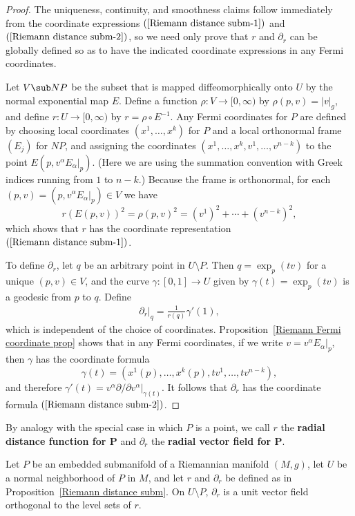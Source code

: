 \begin{proof}
The uniqueness, continuity, and smoothness claims follow immediately from the coordinate expressions $(\ref{Riemann distance subm-1})$ and $(\ref{Riemann distance subm-2})$, 
so we need only prove that $r$ and $\partial_r$ can be globally defined so as to have the indicated coordinate expressions in any Fermi coordinates.\par
Let $V\sub NP$ be the subset that is mapped diffeomorphically onto $U$ by the normal exponential map $E$. Define a function $\rho:V\to[0,\infty)$ by $\rho(p,v)=|v|_g$, 
and define $r:U\to[0,\infty)$ by $r=\rho\circ E^{-1}$. Any Fermi coordinates for $P$ are defined by choosing local coordinates $(x^1,\dots,x^k)$ for $P$ and a local 
orthonormal frame $(E_j)$ for $NP$, and assigning the coordinates $(x^1,\dots,x^k,v^1,\dots,v^{n-k})$ to the point $E(p,v^\alpha E_\alpha|_p)$. (Here we are using the 
summation convention with Greek indices running from $1$ to $n-k$.) Because the frame is orthonormal, for each $(p,v)=(p,v^\alpha E_\alpha|_p)\in V$ we have 
\[r(E(p,v))^2=\rho(p,v)^2=(v^1)^2+\cdots+(v^{n-k})^2,\]
which shows that $r$ has the coordinate representation $(\ref{Riemann distance subm-1})$.\par
To define $\partial_r$, let $q$ be an arbitrary point in $U\setminus P$. Then $q=\exp_p(tv)$ for a unique $(p,v)\in V$, and the curve $\gamma:[0,1]\to U$ given by $\gamma(t)=\exp_p(tv)$ 
is a geodesic from $p$ to $q$. Define
\begin{align}\label{Riemann distance subm-3}
\partial_r|_q=\frac{1}{r(q)}\gamma'(1),
\end{align}
which is independent of the choice of coordinates. Proposition~\ref{Riemann Fermi coordinate prop} shows that in any Fermi coordinates, if we write $v=v^\alpha E_\alpha|_p$, then $\gamma$ has the 
coordinate formula 
\[\gamma(t)=(x^1(p),\dots,x^k(p),tv^1,\dots,tv^{n-k}),\]
and therefore $\gamma'(t)=v^\alpha\partial/\partial v^\alpha|_{\gamma(t)}$. It follows that $\partial_r$ has the coordinate formula $(\ref{Riemann distance subm-2})$.
\end{proof}
By analogy with the special case in which $P$ is a point, we call $r$ the \textbf{radial distance function for $\bm{P}$} and $\partial_r$ the \textbf{radial vector field for $\bm{P}$}.
\begin{theorem}\label{Guass lemma subm}
Let $P$ be an embedded submanifold of a Riemannian manifold $(M,g)$, let $U$ be a normal neighborhood of $P$ in $M$, and let $r$ and $\partial_r$ be defined as in 
Proposition~\ref{Riemann distance subm}. On $U\setminus P$, $\partial_r$ is a unit vector field orthogonal to the level sets of $r$.
\end{theorem}
